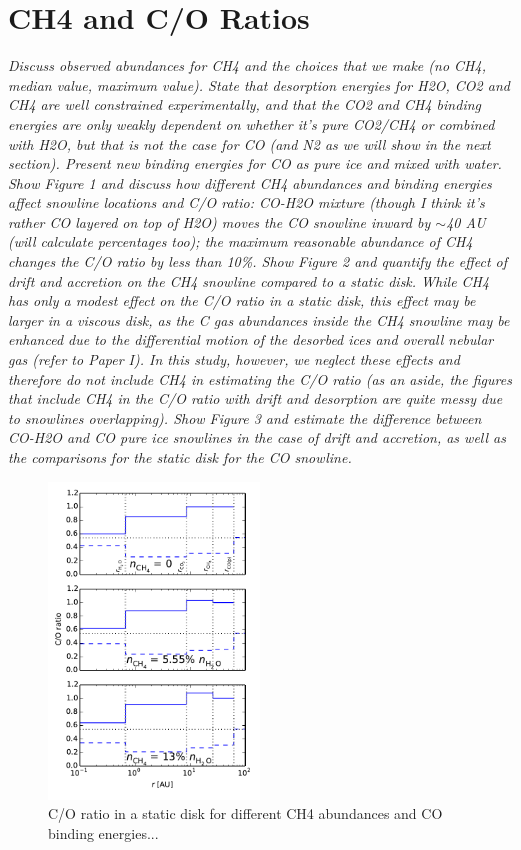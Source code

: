 \documentclass[apj]{emulateapj}
\newcommand{\emgr}[1]{\emph{ \color{gray} #1}}
\begin{document}
\section{CH4 and C/O Ratios}

\emgr{Discuss observed abundances for CH4 and the choices that we make (no CH4, median value, maximum value). State that desorption energies for H2O, CO2 and CH4 are well constrained experimentally, and that the CO2 and CH4 binding energies are only weakly dependent on whether it's pure CO2/CH4 or combined with H2O, but that is not the case for CO (and N2 as we will show in the next section). Present new binding energies for CO as pure ice and mixed with water. Show Figure 1 and discuss how different CH4 abundances and binding energies affect snowline locations and C/O ratio: CO-H2O mixture (though I think it's rather CO layered on top of H2O) moves the CO snowline inward by $\sim$40 AU (will calculate percentages too); the maximum reasonable abundance of CH4 changes the C/O ratio by less than 10\%. Show Figure 2 and quantify the effect of drift and accretion on the CH4 snowline compared to a static disk. While CH4 has only a modest effect on the C/O ratio in a static disk, this effect may be larger in a viscous disk, as the C gas abundances inside the CH4 snowline may be enhanced due to the differential motion of the desorbed ices and overall nebular gas (refer to Paper I). In this study, however, we neglect these effects and therefore do not include CH4 in estimating the C/O ratio (as an aside, the figures that include CH4 in the C/O ratio with drift and desorption are quite messy due to snowlines overlapping). Show Figure 3 and estimate the difference between CO-H2O and CO pure ice snowlines in the case of drift and accretion, as well as the comparisons for the static disk for the CO snowline.}

\begin{figure}[h!]
\centering
\includegraphics[width=0.5\textwidth]{../../figs/C_O_ratio_CH4.pdf}
\caption{C/O ratio in a static disk for different CH4 abundances and CO binding energies...} 
\label{fig:COstatic}
\end{figure}
\end{document}

